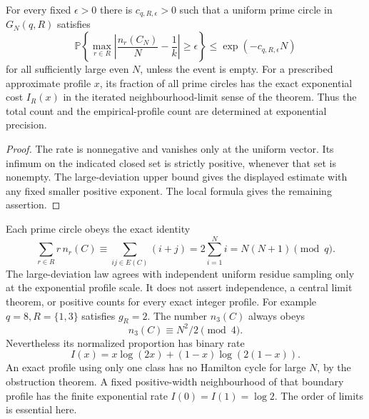 \begin{corollary}
\label{cor:primeprofilecount}
For every fixed \(\epsilon>0\) there is \(c_{q,R,\epsilon}>0\)
such that a uniform prime circle in \(G_N(q,R)\) satisfies
\[
 \mathbb P\left\{\max_{r\in R}
          \left|\frac{n_r(C_N)}N-\frac1k\right|\geq\epsilon\right\}
           \leq\exp(-c_{q,R,\epsilon}N)
\]
for all sufficiently large even \(N\), unless the event is empty.
For a prescribed approximate profile \(x\), its fraction of
all prime circles has the exact exponential cost \(I_R(x)\)
in the iterated neighbourhood-limit sense of the theorem.
Thus the total count and the empirical-profile count are
determined at exponential precision.
\end{corollary}
\begin{proof}
The rate is nonnegative and vanishes only at the uniform
vector. Its infimum on the indicated closed set is strictly
positive, whenever that set is nonempty.
The large-deviation upper bound gives the displayed estimate
with any fixed smaller positive exponent.
The local formula gives the remaining assertion.
\end{proof}

\begin{remark}
Each prime circle obeys the exact identity
\[
 \sum_{r\in R}r\,n_r(C)
       \equiv\sum_{ij\in E(C)}(i+j)
       =2\sum_{i=1}^N i=N(N+1)\pmod q.
\]
The large-deviation law agrees with independent uniform
residue sampling only at the exponential profile scale.
It does not assert independence, a central limit theorem,
or positive counts for every exact integer profile.
For example \(q=8,R=\{1,3\}\) satisfies \(g_R=2\).
The number \(n_3(C)\) always obeys
\[
 n_3(C)\equiv N^2/2\pmod4.
\]
Nevertheless its normalized proportion has binary rate
\[
 I(x)=x\log(2x)+(1-x)\log(2(1-x)).
\]
An exact profile using only one class has no Hamilton cycle
for large \(N\), by the obstruction theorem.
A fixed positive-width neighbourhood of that boundary
profile has the finite exponential rate \(I(0)=I(1)=\log2\).
The order of limits is essential here.
\end{remark}
